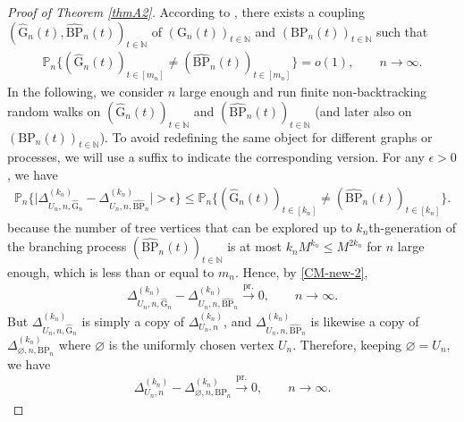 \documentclass[11pt]{article}
\numberwithin{equation}{section}
\theoremstyle{plain}
\newcommand{\N}{\mathbb N}
\newcommand{\prob}{\overset{\mathrm{pr.}}{\longrightarrow}}
\renewcommand{\P}{\mathbb P}
\begin{document}
\begin{proof}[Proof of Theorem \ref{thmA2}]
According to \cite[Lemma 4.2]{RvdH2}, there exists a coupling $(\hat{\mathrm{G}}_{n}(t),\hat{\mathrm{BP}}_{n}(t))_{t\in\N}$ of $(\mathrm{G}_{n}(t))_{t\in\N}$ and $(\mathrm{BP}_{n}(t))_{t\in\N}$ such that
\begin{align}
\label{CM-new-2}
\P_{n}\Big\{(\hat{\mathrm{G}}_{n}(t))_{t\in[m_n]}\neq (\hat{\mathrm{BP}}_{n}(t))_{t\in[m_n]}\Big\}=o(1),\qquad n\to\infty .
\end{align}
In the following, we consider $n$ large enough and run finite non-backtracking random walks on $(\hat{\mathrm{G}}_{n}(t))_{t\in\N}$ and $(\hat{\mathrm{BP}}_{n}(t))_{t\in\N}$ (and later also on $(\mathrm{BP}_{n}(t))_{t\in\N}$). To avoid redefining the same object for different graphs or processes, we will use a suffix to indicate the corresponding version. For any $\epsilon>0$, we have
\begin{align*}
\P_{n}\Big\{\big|\Delta_{U_n,n,\hat{\mathrm{G}}_{n}}^{(k_n)}-\Delta_{U_n,n,\hat{\mathrm{BP}}_{n}}^{(k_n)}\big|>\epsilon\Big\} \leq \P_{n}\Big\{(\hat{\mathrm{G}}_{n}(t))_{t\in[k_n]}\neq (\hat{\mathrm{BP}}_{n}(t))_{t\in[k_n]}\Big\}.
\end{align*}
because the number of tree vertices that can be explored up to $k_n$th-generation of the branching process $(\hat{\mathrm{BP}}_{n}(t))_{t\in\N}$ is at most $k_{n}M^{k_n}\leq M^{2k_n}$ for $n$ large enough, which is less than or equal to $m_n$. Hence, by \eqref{CM-new-2},
\begin{align*}
\Delta_{U_n,n,\hat{\mathrm{G}}_{n}}^{(k_n)}-\Delta_{U_n,n,\hat{\mathrm{BP}}_{n}}^{(k_n)} \prob 0,\qquad n\to\infty.
\end{align*}
But $\Delta_{U_n,n,\hat{\mathrm{G}}_{n}}^{(k_n)}$ is simply a copy of $\Delta_{U_n,n}^{(k_n)}$, and $\Delta_{U_n,n,\hat{\mathrm{BP}}_{n}}^{(k_n)}$ is likewise a copy of $\Delta_{\varnothing,n,\mathrm{BP}_{n}}^{(k_n)}$ where $\varnothing$ is the uniformly chosen vertex $U_n$. Therefore, keeping $\varnothing=U_n$, we have
\begin{align}
\label{CM-neww-2}
\Delta_{U_n,n}^{(k_n)}-\Delta_{\varnothing,n,\mathrm{BP}_{n}}^{(k_n)} \prob 0,\qquad n\to\infty.
\end{align}


\end{proof}
\end{document}
